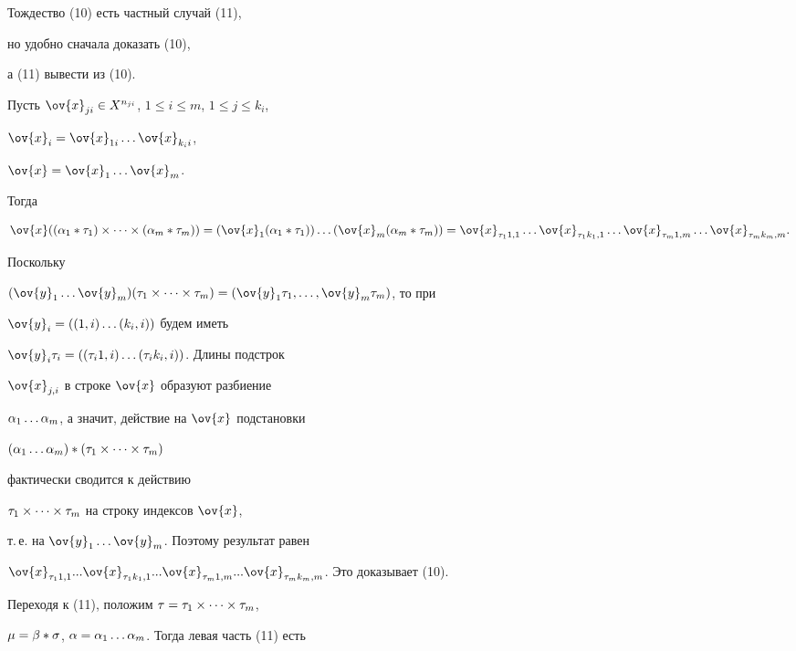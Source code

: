 \begin{pf}


Тождество (10) есть частный случай (11),


но удобно сначала доказать (10),


а (11) вывести из (10).


Пусть $\ov{x}_{ji} \in X^{n_{ji}}$, $1 \le i \le m$, $1 \le j \le k_i$,


$\ov{x}_i=\ov{x}_{1i} \dotsc \ov{x}_{k_{i}i}$,


$\ov{x}=\ov{x}_1 \dotsc \ov{x}_m$.


Тогда


$$


\ov{x}((\al_1*\t_1)\times\dotsb\times (\al_m*\t_m))=


(\ov{x}_1(\al_1*\t_1))\dotsc (\ov{x}_m(\al_m*\t_m))=


\ov{x}_{\t_1 1,1}\dotsc\ov{x}_{\t_1 k_1,1}\dotsc\ov{x}_{\t_m 1,m}\dotsc


\ov{x}_{\t_m k_m,m}.


$$


Поскольку


$(\ov{y}_1\dotsc\ov{y}_m)(\t_1\times\dotsb\times\t_m)=(\ov{y}_1\t_1,


\dotsc,\ov{y}_m\t_m)$, то при


$\ov{y}_i=((1, i)\dotsc (k_i, i))$ будем иметь


$ \ov{y}_i\t_i=((\t_i1,i)\dotsc(\t_i k_i,i))$. Длины подстрок


$\ov{x}_{j,i}$ в строке $\ov{x}$ образуют разбиение


$\alpha_1\dotsc \alpha_m$, а значит, действие на $\ov{x}$ подстановки


$(\alpha_1\dotsc \alpha_m)*(\tau_1\times\dotsb\times\tau_m)$


фактически сводится к действию


$\tau_1\times\dotsb\times\tau_m$ на строку индексов $\ov{x}$,


т.\,е. на $\ov{y}_1\dotsc\ov{y}_m$. Поэтому результат равен


$\ov{x}_{\t_1 1,1}...\ov{x}_{\t_1 k_1,1}...\ov{x}_{\t_m 1,m}...




\ov{x}_{\t_m k_m,m}$. Это доказывает (10).





Переходя к (11), положим $\tau=\tau_1\times\dotsb\times\tau_m$,


$\mu=\beta*\sigma$, $\alpha=\alpha_1\dotsc \alpha_m$. Тогда левая часть (11) есть



\end{pf}
